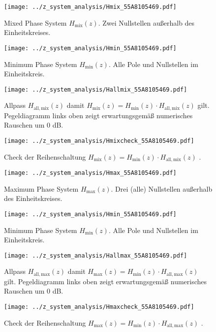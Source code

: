 \begin{figure}
\texttt{[image: ../z\_system\_analysis/Hmix\_55A8105469.pdf]}
\caption{Mixed Phase System $H_\mathrm{mix}(z)$. Zwei Nullstellen außerhalb
des Einheitskreises.}
\label{fig:Hmix_55A8105469}
\end{figure}
\begin{figure}
\texttt{[image: ../z\_system\_analysis/Hmin\_55A8105469.pdf]}
\caption{Minimum Phase System $H_\mathrm{min}(z)$. Alle Pole und Nullstellen
im Einheitskreis.}
\label{fig:Hmin_55A8105469}
\end{figure}
\begin{figure}
\texttt{[image: ../z\_system\_analysis/Hallmix\_55A8105469.pdf]}
\caption{Allpass $H_\mathrm{all,mix}(z)$ damit
$H_\mathrm{mix}(z) = H_\mathrm{min}(z) \cdot H_\mathrm{all,mix}(z)$ gilt.
Pegeldiagramm links oben zeigt erwartungsgemäß numerisches Rauschen um 0 dB.}
\label{fig:Hallmix_55A8105469}
\end{figure}
\begin{figure}
\texttt{[image: ../z\_system\_analysis/Hmixcheck\_55A8105469.pdf]}
\caption{Check der Reihenschaltung
$H_\mathrm{mix}(z) = H_\mathrm{min}(z) \cdot H_\mathrm{all,mix}(z)$ .}
\label{fig:Hmixcheck_55A8105469}
\end{figure}
%
\begin{figure}
\texttt{[image: ../z\_system\_analysis/Hmax\_55A8105469.pdf]}
\caption{Maximum Phase System $H_\mathrm{max}(z)$. Drei (alle) Nullstellen
außerhalb des Einheitskreises.}
\label{fig:Hmax_55A8105469}
\end{figure}
\begin{figure}
\texttt{[image: ../z\_system\_analysis/Hmin\_55A8105469.pdf]}
\caption{Minimum Phase System $H_\mathrm{min}(z)$. Alle Pole und Nullstellen
im Einheitskreis.}
\label{fig:Hmin_55A8105469_2}
\end{figure}
\begin{figure}
\texttt{[image: ../z\_system\_analysis/Hallmax\_55A8105469.pdf]}
\caption{Allpass $H_\mathrm{all,max}(z)$ damit
$H_\mathrm{max}(z) = H_\mathrm{min}(z) \cdot H_\mathrm{all,max}(z)$ gilt.
Pegeldiagramm links oben zeigt erwartungsgemäß numerisches Rauschen um 0 dB.}
\label{fig:Hallmax_55A8105469}
\end{figure}
\begin{figure}
\texttt{[image: ../z\_system\_analysis/Hmaxcheck\_55A8105469.pdf]}
\caption{Check der Reihenschaltung
$H_\mathrm{max}(z) = H_\mathrm{min}(z) \cdot H_\mathrm{all,max}(z)$ .}
\label{fig:Hmaxcheck_55A8105469}
\end{figure}
